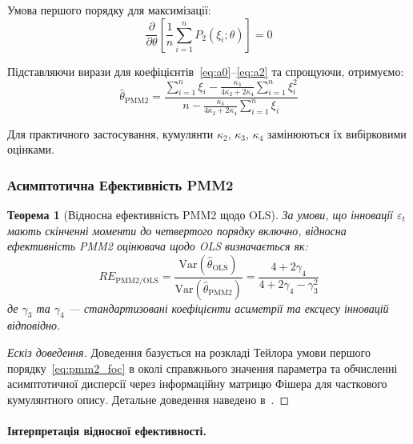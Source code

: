 \documentclass[12pt,a4paper]{article}
\newtheorem{theorem}{Теорема}[section]
\begin{document}
Умова першого порядку для максимізації:
\begin{equation}
\label{eq:pmm2_foc}
\frac{\partial}{\partial \theta} \left[ \frac{1}{n} \sum_{i=1}^{n} P_2(\xi_i; \theta) \right] = 0
\end{equation}

Підставляючи вирази для коефіцієнтів~\eqref{eq:a0}--\eqref{eq:a2} та спрощуючи, отримуємо:
\begin{equation}
\label{eq:pmm2_solution}
\hat{\theta}_{\text{PMM2}} = \frac{\sum_{i=1}^{n} \xi_i - \frac{\kappa_3}{4\kappa_2 + 2\kappa_4} \sum_{i=1}^{n} \xi_i^2}{n - \frac{\kappa_3}{4\kappa_2 + 2\kappa_4} \sum_{i=1}^{n} \xi_i}
\end{equation}

Для практичного застосування, кумулянти $\kappa_2$, $\kappa_3$, $\kappa_4$ замінюються їх вибірковими оцінками.

\subsubsection{Асимптотична Ефективність PMM2}

\begin{theorem}[Відносна ефективність PMM2 щодо OLS]
\label{thm:relative_efficiency}
За умови, що інновації $\varepsilon_t$ мають скінченні моменти до четвертого порядку включно, відносна ефективність PMM2 оцінювача щодо OLS визначається як:
\begin{equation}
\label{eq:re_pmm2_ols}
RE_{\text{PMM2/OLS}} = \frac{\text{Var}(\hat{\theta}_{\text{OLS}})}{\text{Var}(\hat{\theta}_{\text{PMM2}})} = \frac{4 + 2\gamma_4}{4 + 2\gamma_4 - \gamma_3^2}
\end{equation}
де $\gamma_3$ та $\gamma_4$ --- стандартизовані коефіцієнти асиметрії та ексцесу інновацій відповідно.
\end{theorem}

\begin{proof}[Ескіз доведення]
Доведення базується на розкладі Тейлора умови першого порядку~\eqref{eq:pmm2_foc} в околі справжнього значення параметра та обчисленні асимптотичної дисперсії через інформаційну матрицю Фішера для часткового кумулянтного опису. Детальне доведення наведено в~\cite{kunchenko2002polynomial,zabolotnii2018polynomial}.
\end{proof}

\paragraph{Інтерпретація відносної ефективності.}
\end{document}
